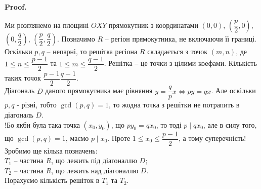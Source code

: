 \documentclass[a4paper, 14pt]{extarticle}
\makeatletter
\theoremstyle{theoremdd}
\theoremstyle{theoremdd}
\theoremstyle{theoremdd}
\theoremstyle{theoremdd}
\theoremstyle{theoremdd}
\theoremstyle{theoremdd}
\theoremstyle{theoremdd}
\theoremstyle{theoremdd}
\def\qed{$\blacksquare$}
\renewenvironment{proof}[1][Proof.\\]{\par
\pushQED{\hfill \qed}%
\normalfont \topsep6\p@\@plus6\p@\relax
\trivlist
\item\relax
{\bfseries
#1\@addpunct{.}}\hspace\labelsep\ignorespaces
}{%
\popQED\endtrivlist\@endpefalse
}
\makeatother
\begin{document}
\begin{proof}
Ми розглянемо на площині $OXY$ прямокутник з координатами $\left(0,0 \right)$, $\left(\dfrac{p}{2},0 \right)$, $\left(0,\dfrac{q}{2} \right)$, $\left(\dfrac{p}{2},\dfrac{q}{2} \right)$. Позначимо $R$ -- регіон прямокутника, не включаючи її границі.\\
Оскільки $p,q$ -- непарні, то решітка регіона $R$ складається з точок $(m,n)$, де $1 \leq n \leq \dfrac{p-1}{2}$ та $1 \leq m \leq \dfrac{q-1}{2}$. Решітка -- це точки з цілими коефами. Кількість таких точок $\dfrac{p-1}{2} \dfrac{q-1}{2}$.\\
Діагональ $D$ даного прямокутника має рівняння $y = \dfrac{q}{p}x \iff py = qx$. Але оскільки $p,q$ - різні, тобто $\gcd(p,q) = 1$, то жодна точка з решітки не потрапить в діагональ $D$.\\
!Бо якби була така точка $(x_0,y_0)$, що $py_0 = qx_0$, то тоді $p \mid qx_0$, але в силу того, що $\gcd(p,q) = 1$, маємо $p \mid x_0$. Проте $1 \leq x_0 \leq \dfrac{p-1}{2}$, а тому суперечність!\\
Зробимо ще кілька позначень:\\
$T_1$ -- частина $R$, що лежить під діагоналлю $D$; \\
$T_2$ -- частина $R$, що лежить над діагоналлю $D$. \\
Порахуємо кількість решіток в $T_1$ та $T_2$.
\begin{figure}[H]
\centering
{}
\end{figure}
\end{proof}
\end{document}
